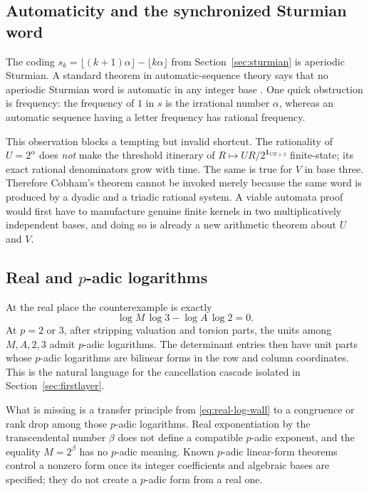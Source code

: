 \documentclass[11pt,oneside]{article}
\theoremstyle{definition}
\theoremstyle{remark}
\begin{document}
\subsection{Automaticity and the synchronized Sturmian word}

The coding $s_k=\lfloor(k+1)\alpha\rfloor-\lfloor k\alpha\rfloor$ from
Section~\ref{sec:sturmian} is aperiodic Sturmian.  A standard theorem in automatic-sequence
theory says that no aperiodic Sturmian word is automatic in any integer base
\cite{Cobham1972,AlloucheShallit2003}.  One quick obstruction is frequency: the frequency of
$1$ in $s$ is the irrational number $\alpha$, whereas an automatic sequence having a letter
frequency has rational frequency.

This observation blocks a tempting but invalid shortcut.  The rationality of
$U=2^\alpha$ does \emph{not} make the threshold itinerary of
$R\mapsto UR/2^{\mathbf1_{UR\ge2}}$ finite-state; its exact rational denominators grow with
time.  The same is true for $V$ in base three.  Therefore Cobham's theorem cannot be invoked
merely because the same word is produced by a dyadic and a triadic rational system.  A viable
automata proof would first have to manufacture genuine finite kernels in two multiplicatively
independent bases, and doing so is already a new arithmetic theorem about $U$ and $V$.

\subsection{Real and \texorpdfstring{$p$}{p}-adic logarithms}

At the real place the counterexample is exactly
\begin{equation}\label{eq:real-log-wall}
 \log M\,\log3-\log A\,\log2=0.
\end{equation}
At $p=2$ or $3$, after stripping valuation and torsion parts, the units among
$M,A,2,3$ admit $p$-adic logarithms.  The determinant entries then have unit parts whose
$p$-adic logarithms are bilinear forms in the row and column coordinates.  This is the natural
language for the cancellation cascade isolated in Section~\ref{sec:firstlayer}.

What is missing is a transfer principle from \eqref{eq:real-log-wall} to a congruence or rank
drop among those $p$-adic logarithms.  Real exponentiation by the transcendental number
$\beta$ does not define a compatible $p$-adic exponent, and the equality $M=2^\beta$ has no
$p$-adic meaning.  Known $p$-adic linear-form theorems control a nonzero form once its integer
coefficients and algebraic bases are specified; they do not create a $p$-adic form from a real
one.
\end{document}
